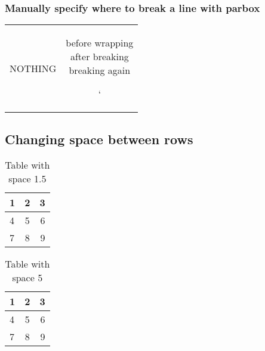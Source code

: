 \documentclass{article}
\begin{document}
	\subsubsection{Manually specify where to break a line with parbox}
	\begin{tabular}{cc}
		NOTHING & \parbox[t]{5cm}{before wrapping\\after breaking\\ breaking again}`
	\end{tabular}

	\subsection{Changing space between rows}
	\begin{table}
		\renewcommand{\arraystretch}{1.5}
		\begin{center}
		\begin{tabular}{ | l | c | r |}
			\hline
			1 & 2 & 3 \\ \hline
			4 & 5 & 6 \\ \hline
			7 & 8 & 9 \\
			\hline
		\end{tabular}
		\end{center}
	\caption{Table with space 1.5}
	\end{table}

		\begin{table}
		\renewcommand{\arraystretch}{5}
		\begin{center}
			\begin{tabular}{ | l | c | r |}
				\hline
				1 & 2 & 3 \\ \hline
				4 & 5 & 6 \\ \hline
				7 & 8 & 9 \\
				\hline
			\end{tabular}
		\end{center}
		\caption{Table with space 5}
	\end{table}
	
\end{document}
